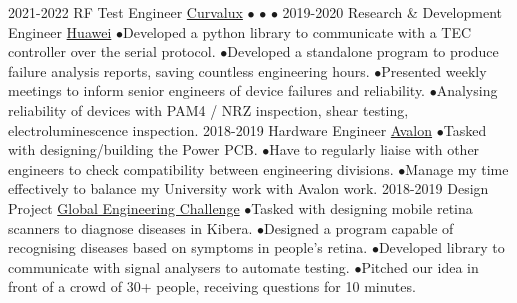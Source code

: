 \documentclass[9pt]{developercv} %
\begin{document}
\begin{entrylist}
	\entry
		{2021-2022}
		{RF Test Engineer}
		{\href{https://Curvalux.com}{Curvalux}}
		{
			$\bullet$\hspace*{0.5cm}\lorem\newline
			$\bullet$\hspace*{0.5cm}\lorem\newline
			$\bullet$\hspace*{0.5cm}\lorem
		}
	\entry
		{2019-2020}
		{Research \& Development Engineer}
		{\href{https://www.huawei.com/uk/contact-us}{Huawei}}
		{
			$\bullet$\hspace*{0.5cm}Developed a python library to communicate with a TEC controller over the serial protocol.\newline
			$\bullet$\hspace*{0.5cm}Developed a standalone program to produce failure analysis reports, saving countless engineering hours.\newline
			$\bullet$\hspace*{0.5cm}Presented weekly meetings to inform senior engineers of device failures and reliability.\newline
			$\bullet$\hspace*{0.5cm}Analysing reliability of devices with PAM4 / NRZ inspection, shear testing, electroluminescence inspection.
		}
		\entry
		{2018-2019}
		{Hardware Engineer}
		{\href{https://avalonrov.wixsite.com/avalonrov}{Avalon}}
		{
			$\bullet$\hspace*{0.5cm}Tasked with designing/building the Power PCB.\newline
			$\bullet$\hspace*{0.5cm}Have to regularly liaise with other engineers to check compatibility between engineering divisions.\newline
			$\bullet$\hspace*{0.5cm}Manage my time effectively to balance my University work with Avalon work.
		}
		\entry
		{2018-2019}
		{Design Project}
		{\href{https://www.sheffield.ac.uk/engineering/study/global-engineering-challenge}{Global Engineering Challenge}}
		{
			$\bullet$\hspace*{0.5cm}Tasked with designing mobile retina scanners to diagnose diseases in Kibera.\newline
			$\bullet$\hspace*{0.5cm}Designed a program capable of recognising diseases based on symptoms in people's retina.\newline
			$\bullet$\hspace*{0.5cm}Developed library to communicate with signal analysers to automate testing.\newline
			$\bullet$\hspace*{0.5cm}Pitched our idea in front of a crowd of 30+ people, receiving questions for 10 minutes.
		}	
\end{entrylist}
\end{document}
